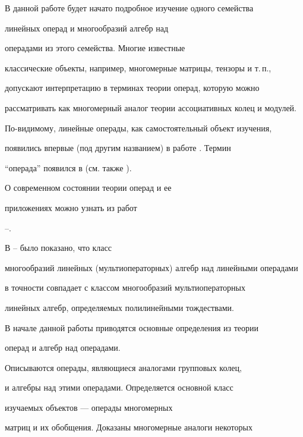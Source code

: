 

\maketitle


\label{begin}





В данной работе будет начато подробное изучение одного семейства


линейных операд и многообразий алгебр над


операдами из этого семейства. Многие известные


классические объекты, например, многомерные матрицы, тензоры и т.\,п.,


допускают интерпретацию в терминах теории операд, которую можно


рассматривать как многомерный аналог теории ассоциативных колец и модулей.


По-видимому, линейные операды, как самостоятельный объект изучения,


появились впервые (под другим названием) в работе \cite{Art}. Термин


``операда'' появился в \cite{May} (см. также \cite{BF}).


О современном состоянии теории операд и ее


приложениях можно узнать из работ


\cite{Smir}--\cite{Dal}.


В \cite{T1}--\cite{T} было показано, что класс


многообразий линейных (мультиоператорных) алгебр над линейными операдами


в точности совпадает с классом многообразий мультиоператорных


линейных алгебр, определяемых полилинейными тождествами.





В начале данной работы приводятся основные определения из теории


операд и алгебр над операдами.


Описываются операды, являющиеся аналогами групповых колец,


и алгебры над этими операдами. Определяется основной класс


изучаемых объектов --- операды многомерных


матриц и их обобщения. Доказаны многомерные аналоги некоторых


